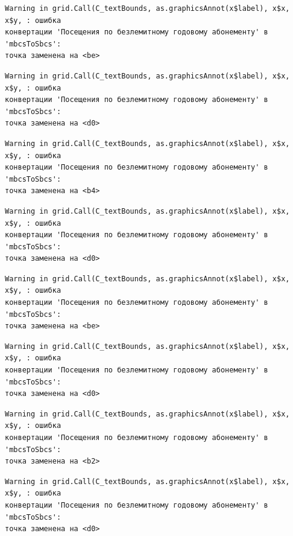 \documentclass[
  letterpaper,
  DIV=11,
  numbers=noendperiod]{scrreprt}
\begin{document}
\begin{verbatim}
Warning in grid.Call(C_textBounds, as.graphicsAnnot(x$label), x$x, x$y, : ошибка
конвертации 'Посещения по безлемитному годовому абонементу' в 'mbcsToSbcs':
точка заменена на <be>
\end{verbatim}

\begin{verbatim}
Warning in grid.Call(C_textBounds, as.graphicsAnnot(x$label), x$x, x$y, : ошибка
конвертации 'Посещения по безлемитному годовому абонементу' в 'mbcsToSbcs':
точка заменена на <d0>
\end{verbatim}

\begin{verbatim}
Warning in grid.Call(C_textBounds, as.graphicsAnnot(x$label), x$x, x$y, : ошибка
конвертации 'Посещения по безлемитному годовому абонементу' в 'mbcsToSbcs':
точка заменена на <b4>
\end{verbatim}

\begin{verbatim}
Warning in grid.Call(C_textBounds, as.graphicsAnnot(x$label), x$x, x$y, : ошибка
конвертации 'Посещения по безлемитному годовому абонементу' в 'mbcsToSbcs':
точка заменена на <d0>
\end{verbatim}

\begin{verbatim}
Warning in grid.Call(C_textBounds, as.graphicsAnnot(x$label), x$x, x$y, : ошибка
конвертации 'Посещения по безлемитному годовому абонементу' в 'mbcsToSbcs':
точка заменена на <be>
\end{verbatim}

\begin{verbatim}
Warning in grid.Call(C_textBounds, as.graphicsAnnot(x$label), x$x, x$y, : ошибка
конвертации 'Посещения по безлемитному годовому абонементу' в 'mbcsToSbcs':
точка заменена на <d0>
\end{verbatim}

\begin{verbatim}
Warning in grid.Call(C_textBounds, as.graphicsAnnot(x$label), x$x, x$y, : ошибка
конвертации 'Посещения по безлемитному годовому абонементу' в 'mbcsToSbcs':
точка заменена на <b2>
\end{verbatim}

\begin{verbatim}
Warning in grid.Call(C_textBounds, as.graphicsAnnot(x$label), x$x, x$y, : ошибка
конвертации 'Посещения по безлемитному годовому абонементу' в 'mbcsToSbcs':
точка заменена на <d0>
\end{verbatim}
\end{document}
